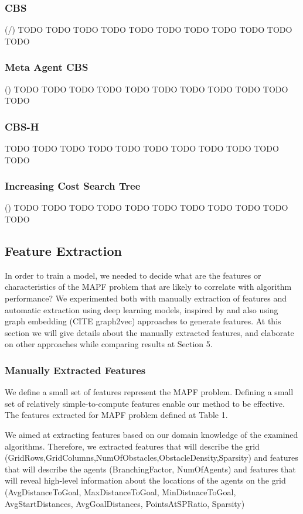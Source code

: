 \documentclass[letterpaper]{article} %
\begin{document}
\subsubsection{ CBS }
(\cite{sharon2015conflict}/)
TODO TODO TODO TODO TODO TODO TODO TODO TODO TODO TODO
\subsubsection{ Meta Agent CBS }
(\cite{sharon2012meta})
TODO TODO TODO TODO TODO TODO TODO TODO TODO TODO TODO
\subsubsection{ CBS-H }
TODO TODO TODO TODO TODO TODO TODO TODO TODO TODO TODO
\subsubsection{ Increasing Cost Search Tree } (\cite{sharon2013increasing})
TODO TODO TODO TODO TODO TODO TODO TODO TODO TODO TODO


\subsection{Feature Extraction}
In order to train a model, we needed to decide what are the features or
characteristics of the MAPF problem that are likely to correlate with algorithm performance? We experimented both with manually extraction of features and automatic extraction using deep learning models, inspired by \cite{sigurdson2019deep} and also using graph embedding (CITE graph2vec) approaches to generate features. At this section we will give details about the manually extracted features, and elaborate on other approaches while comparing results at Section 5.

\subsubsection{Manually Extracted Features} We define a small set of features represent the MAPF problem. Defining a small set of relatively simple-to-compute features enable our method to be effective. The features extracted for MAPF problem defined at Table 1.

We aimed at extracting features based on our domain knowledge of the examined algorithms. Therefore, we extracted features that will describe the grid (GridRows,GridColumns,NumOfObstacles,ObstacleDensity,Sparsity) and features that will describe the agents (BranchingFactor, NumOfAgents) and features that will reveal high-level information about the locations of the agents on the grid (AvgDistanceToGoal, MaxDistanceToGoal, MinDistnaceToGoal, AvgStartDistances, AvgGoalDistances, PointsAtSPRatio, Sparsity)
\end{document}

